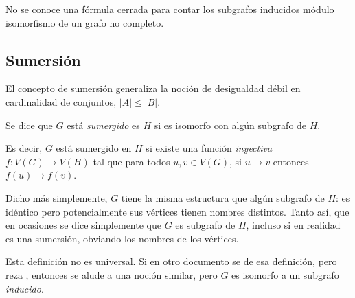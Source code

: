 No se conoce una fórmula cerrada para contar los subgrafos inducidos módulo isomorfismo de un grafo no completo.


\subsection{Sumersión}
\label{sec:sumersion}

El concepto de sumersión generaliza la noción de desigualdad débil en cardinalidad de conjuntos, \(|A|\leq |B|\). 

\begin{definicion}{}{}
  Se dice que \(G\) está \emph{sumergido} es \(H\) si es isomorfo con algún subgrafo de \(H\).
\end{definicion}
Es decir, \(G\) está sumergido en \(H\) si existe una función \emph{inyectiva} \(f\colon V(G) \to V(H)\) tal que para todos \(u,v \in V(G)\), si \(u\longrightarrow v\) entonces \(f(u) \longrightarrow f(v)\).

Dicho más simplemente, \(G\) tiene la misma estructura que algún subgrafo de \(H\): es idéntico pero potencialmente sus vértices tienen nombres distintos. Tanto así, que en ocasiones se dice simplemente que \(G\) es subgrafo de \(H\), incluso si en realidad es una sumersión, obviando los nombres de los vértices.

Esta definición no es universal. Si en otro documento se de esa definición, pero reza , entonces se alude a una noción similar, pero \(G\) es isomorfo a un subgrafo \emph{inducido}.